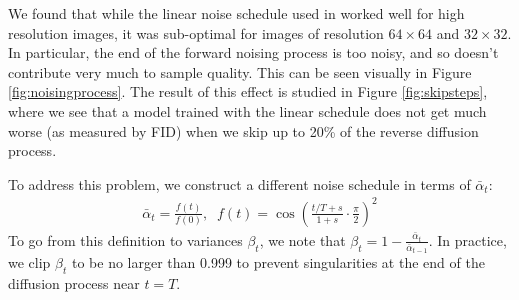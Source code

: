 \documentclass{article}
\begin{document}

We found that while the linear noise schedule used in \citet{ddpm} worked well for high resolution images, it was sub-optimal for images of resolution $64 \times 64$ and $32 \times 32$. In particular, the end of the forward noising process is too noisy, and so doesn't contribute very much to sample quality. This can be seen visually in Figure \ref{fig:noisingprocess}. The result of this effect is studied in Figure \ref{fig:skipsteps}, where we see that a model trained with the linear schedule does not get much worse (as measured by FID) when we skip up to 20\% of the reverse diffusion process.

To address this problem, we construct a different noise schedule in terms of $\bar{\alpha}_t$:
\begin{align}
\bar{\alpha}_t = \frac{f(t)}{f(0)},\;\; f(t) = \cos\left(\frac{t/T + s}{1+s}\cdot\frac{\pi}{2}\right)^2
\end{align}
To go from this definition to variances $\beta_t$, we note that $
\beta_t = 1 - \frac{\bar{\alpha}_t}{\bar{\alpha}_{t-1}}$. In practice, we clip $\beta_t$ to be no larger than 0.999 to prevent singularities at the end of the diffusion process near $t=T$.
\end{document}
